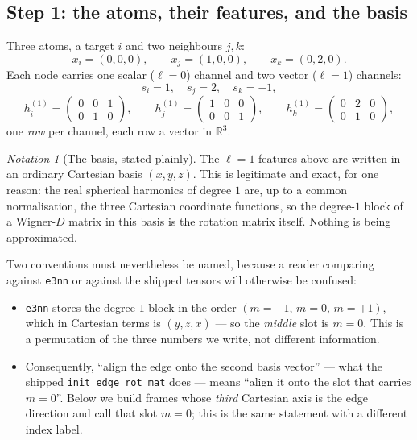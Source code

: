 \documentclass[11pt,a4paper]{report}
\theoremstyle{definition}
\theoremstyle{remark}
\newtheorem{notation}[notation]{Notation}
\newcommand{\RR}{\mathbb R}
\newcommand{\pyfunc}[1]{\texttt{#1}}
\begin{document}
\subsection{Step 1: the atoms, their features, and the basis}
\label{sec:toy-setup}

Three atoms, a target $i$ and two neighbours $j,k$:
\[
x_i=(0,0,0),\qquad x_j=(1,0,0),\qquad x_k=(0,2,0) .
\]
Each node carries one scalar ($\ell=0$) channel and two vector ($\ell=1$)
channels:
\[
s_i=1,\quad s_j=2,\quad s_k=-1 ,
\]
\[
h^{(1)}_i=\begin{pmatrix}0&0&1\\ 0&1&0\end{pmatrix},
\qquad
h^{(1)}_j=\begin{pmatrix}1&0&0\\ 0&0&1\end{pmatrix},
\qquad
h^{(1)}_k=\begin{pmatrix}0&2&0\\ 0&1&0\end{pmatrix},
\]
one \emph{row} per channel, each row a vector in $\RR^3$.

\begin{notation}[The basis, stated plainly]
\label{not:toy-basis}
The $\ell=1$ features above are written in an ordinary Cartesian basis
$(x,y,z)$. This is legitimate and exact, for one reason: the real
spherical harmonics of degree $1$ are, up to a common normalisation, the
three Cartesian coordinate functions, so the degree-$1$ block of a
Wigner-$D$ matrix in this basis is the rotation matrix itself. Nothing is
being approximated.

Two conventions must nevertheless be named, because a reader comparing
against \texttt{e3nn} or against the shipped tensors will otherwise be
confused:
\begin{itemize}[nosep]
\item \texttt{e3nn} stores the degree-$1$ block in the order
      $(m=-1,\,m=0,\,m=+1)$, which in Cartesian terms is $(y,z,x)$ --- so the
      \emph{middle} slot is $m=0$. This is a permutation of the three numbers
      we write, not different information.
\item Consequently, ``align the edge onto the second basis vector'' --- what
      the shipped \pyfunc{init\_edge\_rot\_mat} does --- means ``align it
      onto the slot that carries $m=0$''. Below we build frames whose \emph{third}
      Cartesian axis is the edge direction and call that slot $m=0$; this is
      the same statement with a different index label.
\end{itemize}
\end{notation}
\end{document}
